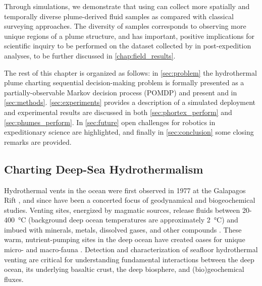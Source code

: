 Through simulations, we demonstrate that \Sentry using \PHORTEX can collect more spatially and temporally diverse plume-derived fluid samples as compared with classical surveying approaches. The diversity of samples corresponds to observing more unique regions of a plume structure, and has important, positive implications for scientific inquiry to be performed on the dataset collected by \Sentry in post-expedition analyses, to be further discussed in \cref{chap:field_results}. 

The rest of this chapter is organized as follows: in \cref{sec:problem} the hydrothermal plume charting sequential decision-making problem is formally presented as a partially-observable Markov decision process (POMDP) and present \PHORTEX and \PHUMES in \cref{sec:methods}. \cref{sec:experiments} provides a description of a simulated deployment and experimental results are discussed in both \cref{sec:phortex_perform} and \cref{sec:phumes_perform}. In \cref{sec:future} open challenges for robotics in expeditionary science are highlighted, and finally in \cref{sec:conclusion} some closing remarks are provided. 

\subsection{Charting Deep-Sea Hydrothermalism}
\label{sec:charting-plumes}
Hydrothermal vents in the ocean were first observed in 1977 at the Galapagos Rift \autocite{corliss1979submarine}, and since have been a concerted focus of geodynamical and biogeochemical studies. Venting sites, energized by magmatic sources, release fluids between 20-\SI{400}{\celsius} (background deep ocean temperatures are approximately \SI{2}{\celsius}) and imbued with minerals, metals, dissolved gases, and other compounds \autocite{jannasch1985geomicrobiology, martin2008hydrothermal}. These warm, nutrient-pumping sites in the deep ocean have created oases for unique micro- and macro-fauna \autocite{corliss1979submarine}. Detection and characterization of seafloor hydrothermal venting are critical for understanding fundamental interactions between the deep ocean, its underlying basaltic crust, the deep biosphere, and (bio)geochemical fluxes.

